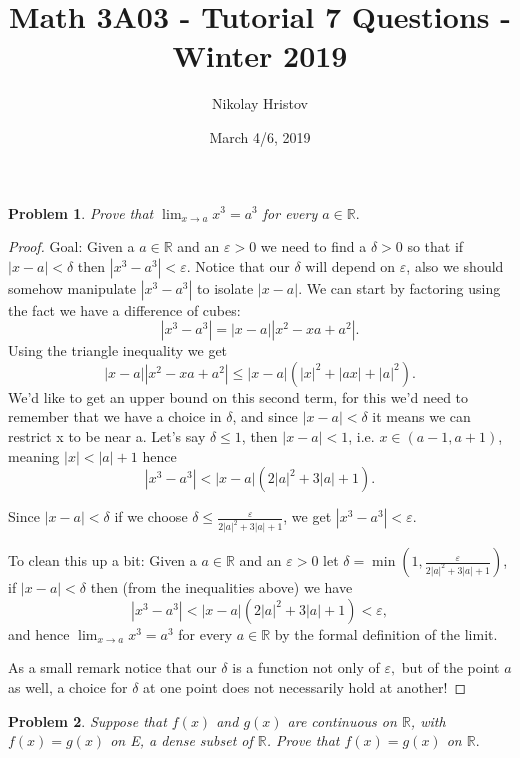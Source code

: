 \documentclass[11pt]{article}
\theoremstyle{plain}
\newtheorem{problem}{Problem}
\theoremstyle{remark}
\newcommand {\mbR} {\mathbb R}
\newcommand {\eps} {\varepsilon}
\newcommand {\del} {\delta}
\begin{document}
	\title{Math 3A03 - Tutorial 7 Questions - Winter 2019}
	\author{Nikolay Hristov}
	\date{March 4/6, 2019}
	\maketitle
	
	
	\begin{problem}
		Prove that $\displaystyle \lim_{x\rightarrow a} x^3 = a^3$ for every $a\in \mathbb R.$
	\end{problem}

	\begin{proof}
		Goal: Given a $a\in\mbR$ and an $\eps>0$ we need to find a $\del>0$ so that if $|x-a|<\del$ then $|x^3-a^3|<\eps$. Notice that our $\del$ will depend on $\eps$, also we should somehow manipulate $|x^3-a^3|$ to isolate $|x-a|$. We can start by factoring using the fact we have a difference of cubes: \[|x^3-a^3|= |x-a||x^2-xa+a^2|.\] Using the triangle inequality we get \[|x-a||x^2-xa+a^2|\leq |x-a|(|x|^2+|ax|+|a|^2).\] We'd like to get an upper bound on this second term, for this we'd need to remember that we have a choice in $\del$, and since $|x-a|<\del$ it means we can restrict x to be near a. Let's say $\del \leq 1$, then $|x-a|<1$, i.e. $x\in (a-1,a+1)$, meaning $|x|<|a|+1$ hence \[|x^3-a^3|<|x-a|(2|a|^2+3|a|+1).\]
		
		Since $|x-a|<\delta$ if we choose $\delta \leq \frac{\eps}{2|a|^2+3|a|+1}$, we get $|x^3-a^3|<\eps$.
		
		To clean this up a bit: Given a $a\in\mbR$ and an $\eps>0$ let $\del = \min(1,\frac{\eps}{2|a|^2+3|a|+1})$, if $|x-a|<\del$ then (from the inequalities above) we have \[|x^3-a^3|<|x-a|(2|a|^2+3|a|+1)<\eps,\] and hence $\displaystyle \lim_{x\rightarrow a} x^3 = a^3$ for every $a\in \mathbb R$ by the formal definition of the limit.
		
		As a small remark notice that our $\del$ is a function not only of $\eps,$ but of the point $a$ as well, a choice for $\del$ at one point does not necessarily hold at another!
	\end{proof} 
	
	\begin{problem}
		Suppose that $f(x)$ and $g(x)$ are continuous on $\mbR$, with $f(x)=g(x)$ on E, a dense subset of $\mbR$. Prove that $f(x)=g(x)$ on $\mbR.$ 
	\end{problem}
\end{document}
